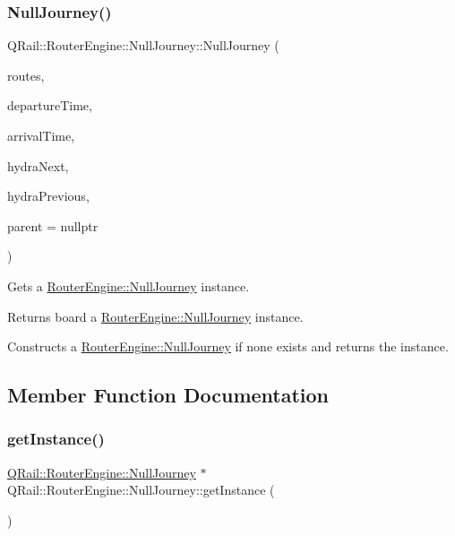 \subsubsection{\texorpdfstring{NullJourney()}{NullJourney()}}
{\footnotesize\ttfamily Q\+Rail\+::\+Router\+Engine\+::\+Null\+Journey\+::\+Null\+Journey (\begin{DoxyParamCaption}\item[{const Q\+List$<$ \mbox{\hyperlink{classQRail_1_1RouterEngine_1_1Route}{Q\+Rail\+::\+Router\+Engine\+::\+Route}} $\ast$ $>$}]{routes,  }\item[{const Q\+Date\+Time}]{departure\+Time,  }\item[{const Q\+Date\+Time}]{arrival\+Time,  }\item[{const Q\+Url}]{hydra\+Next,  }\item[{const Q\+Url}]{hydra\+Previous,  }\item[{Q\+Object $\ast$}]{parent = {\ttfamily nullptr} }\end{DoxyParamCaption})\hspace{0.3cm}{\ttfamily [explicit]}}



Gets a \mbox{\hyperlink{classQRail_1_1RouterEngine_1_1NullJourney}{Router\+Engine\+::\+Null\+Journey}} instance. 

\begin{DoxyReturn}{Returns}
board a \mbox{\hyperlink{classQRail_1_1RouterEngine_1_1NullJourney}{Router\+Engine\+::\+Null\+Journey}} instance.
\end{DoxyReturn}
Constructs a \mbox{\hyperlink{classQRail_1_1RouterEngine_1_1NullJourney}{Router\+Engine\+::\+Null\+Journey}} if none exists and returns the instance. 

\subsection{Member Function Documentation}
\mbox{\label{classQRail_1_1RouterEngine_1_1NullJourney_aeb77bc5f13862ab95fd2f776f43e3661}} 
\subsubsection{\texorpdfstring{getInstance()}{getInstance()}}
{\footnotesize\ttfamily \mbox{\hyperlink{classQRail_1_1RouterEngine_1_1NullJourney}{Q\+Rail\+::\+Router\+Engine\+::\+Null\+Journey}} $\ast$ Q\+Rail\+::\+Router\+Engine\+::\+Null\+Journey\+::get\+Instance (\begin{DoxyParamCaption}{ }\end{DoxyParamCaption})\hspace{0.3cm}{\ttfamily [static]}}



